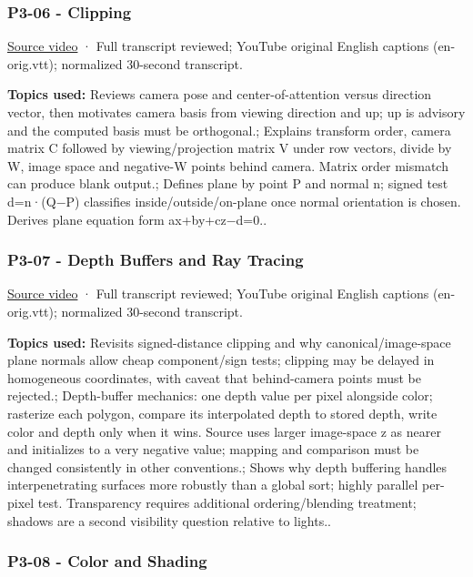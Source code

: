 \subsubsection{P3-06 - Clipping}\label{04-visual-computing-ii-ch036-p3-06---clipping}

\href{https://www.youtube.com/watch?v=og7hOFypKpQ}{Source video} · Full transcript reviewed; YouTube original English captions (en-orig.vtt); normalized 30-second transcript.

\textbf{Topics used:} Reviews camera pose and center-of-attention versus direction vector, then motivates camera basis from viewing direction and up; up is advisory and the computed basis must be orthogonal.; Explains transform order, camera matrix C followed by viewing/projection matrix V under row vectors, divide by W, image space and negative-W points behind camera. Matrix order mismatch can produce blank output.; Defines plane by point P and normal n; signed test d=n·(Q−P) classifies inside/outside/on-plane once normal orientation is chosen. Derives plane equation form ax+by+cz−d=0..

\subsubsection{P3-07 - Depth Buffers and Ray Tracing}\label{04-visual-computing-ii-ch036-p3-07---depth-buffers-and-ray-tracing}

\href{https://www.youtube.com/watch?v=Xks1v4GNUiY}{Source video} · Full transcript reviewed; YouTube original English captions (en-orig.vtt); normalized 30-second transcript.

\textbf{Topics used:} Revisits signed-distance clipping and why canonical/image-space plane normals allow cheap component/sign tests; clipping may be delayed in homogeneous coordinates, with caveat that behind-camera points must be rejected.; Depth-buffer mechanics: one depth value per pixel alongside color; rasterize each polygon, compare its interpolated depth to stored depth, write color and depth only when it wins. Source uses larger image-space z as nearer and initializes to a very negative value; mapping and comparison must be changed consistently in other conventions.; Shows why depth buffering handles interpenetrating surfaces more robustly than a global sort; highly parallel per-pixel test. Transparency requires additional ordering/blending treatment; shadows are a second visibility question relative to lights..

\subsubsection{P3-08 - Color and Shading}\label{04-visual-computing-ii-ch036-p3-08---color-and-shading}

